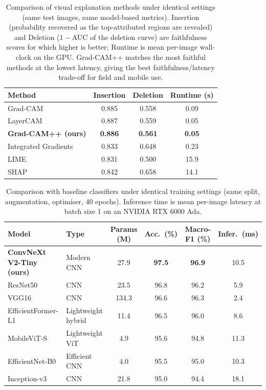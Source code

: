 \documentclass[pdflatex,sn-mathphys-num]{sn-jnl}%
\begin{document}
\begin{table}[htbp]
\centering
\caption{Comparison of visual explanation methods under identical settings (same test images, same model-based metrics). Insertion (probability recovered as the top-attributed regions are revealed) and Deletion ($1-$AUC of the deletion curve) are faithfulness scores for which higher is better; Runtime is mean per-image wall-clock on the GPU. Grad-CAM++ matches the most faithful methods at the lowest latency, giving the best faithfulness/latency trade-off for field and mobile use.}
\label{tab:visual-explanation}
\begin{tabular}{lccc}
\toprule
\textbf{Method} & \textbf{Insertion} & \textbf{Deletion} & \textbf{Runtime (s)} \\
\midrule
Grad-CAM & 0.885 & 0.558 & 0.09 \\
LayerCAM & 0.887 & 0.559 & 0.05 \\
\textbf{Grad-CAM++ (ours)} & \textbf{0.886} & \textbf{0.561} & \textbf{0.05} \\
Integrated Gradients & 0.833 & 0.648 & 0.23 \\
LIME & 0.831 & 0.500 & 15.9 \\
SHAP & 0.842 & 0.658 & 14.1 \\
\bottomrule
\end{tabular}
\end{table}

\begin{table}[htbp]
\centering
\caption{Comparison with baseline classifiers under identical training settings (same split, augmentation, optimiser, 40 epochs). Inference time is mean per-image latency at batch size 1 on an NVIDIA RTX 6000 Ada.}
\label{tab:baselines}
{\small
\setlength{\tabcolsep}{4.5pt}
\begin{tabular}{llcccc}
\toprule
\textbf{Model} & \textbf{Type} & \textbf{Params (M)} & \textbf{Acc.\ (\%)} & \textbf{Macro-F1 (\%)} & \textbf{Infer.\ (ms)} \\
\midrule
\textbf{ConvNeXt V2-Tiny (ours)} & Modern CNN & 27.9 & \textbf{97.5} & \textbf{96.9} & 10.5 \\
ResNet50 & CNN & 23.5 & 96.8 & 96.2 & 5.9 \\
VGG16 & CNN & 134.3 & 96.6 & 96.3 & 2.4 \\
EfficientFormer-L1 & Lightweight hybrid & 11.4 & 96.5 & 96.0 & 8.6 \\
MobileViT-S & Lightweight ViT & 4.9 & 95.6 & 94.8 & 11.3 \\
EfficientNet-B0 & Efficient CNN & 4.0 & 95.5 & 95.0 & 10.3 \\
Inception-v3 & CNN & 21.8 & 95.0 & 94.4 & 18.1 \\
\bottomrule
\end{tabular}
}
\end{table}
\end{document}
